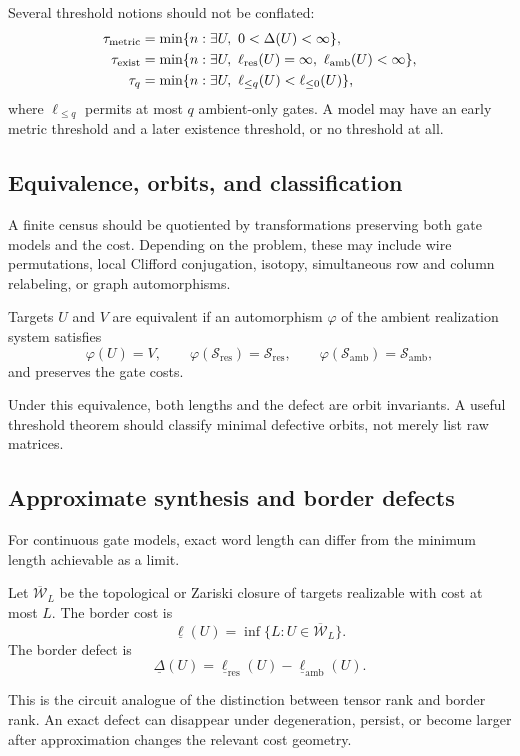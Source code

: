 Several threshold notions should not be conflated:
\begin{align*}
\tau_{\mathrm{metric}}&=\min\{n:\exists U,\ 0<\Delta(U)<\infty\},\\
\tau_{\mathrm{exist}}&=\min\{n:\exists U,\ \ellRes(U)=\infty,\ \ellAmb(U)<\infty\},\\
\tau_{q}&=\min\{n:\exists U,\ \ell_{\le q}(U)<\ell_{\le0}(U)\},
\end{align*}
where $\ell_{\le q}$ permits at most $q$ ambient-only gates.  A model may have an early metric threshold and a later existence threshold, or no threshold at all.

\subsection{Equivalence, orbits, and classification}
A finite census should be quotiented by transformations preserving both gate models and the cost.  Depending on the problem, these may include wire permutations, local Clifford conjugation, isotopy, simultaneous row and column relabeling, or graph automorphisms.

\begin{definition}
Targets $U$ and $V$ are equivalent if an automorphism $\varphi$ of the ambient realization system satisfies
\[
\varphi(U)=V,
\qquad
\varphi(\mathcal S_{\mathrm{res}})=\mathcal S_{\mathrm{res}},
\qquad
\varphi(\mathcal S_{\mathrm{amb}})=\mathcal S_{\mathrm{amb}},
\]
and preserves the gate costs.
\end{definition}
Under this equivalence, both lengths and the defect are orbit invariants.  A useful threshold theorem should classify minimal defective orbits, not merely list raw matrices.

\subsection{Approximate synthesis and border defects}
For continuous gate models, exact word length can differ from the minimum length achievable as a limit.
\begin{definition}
Let $\overline{\mathcal W}_{L}$ be the topological or Zariski closure of targets realizable with cost at most $L$.  The border cost is
\[
\underline\ell(U)=\inf\{L:U\in\overline{\mathcal W}_{L}\}.
\]
The border defect is
\[
\underline\Delta(U)=
\underline\ell_{\mathrm{res}}(U)-
\underline\ell_{\mathrm{amb}}(U).
\]
\end{definition}
This is the circuit analogue of the distinction between tensor rank and border rank.  An exact defect can disappear under degeneration, persist, or become larger after approximation changes the relevant cost geometry.


